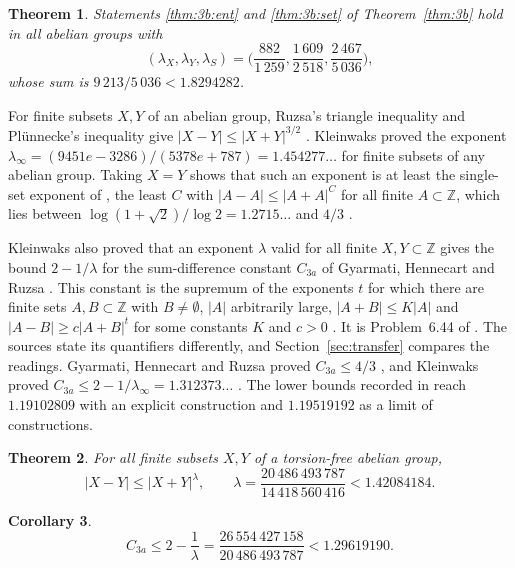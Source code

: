 \documentclass[11pt]{amsart}
\newtheorem{theorem}{Theorem}[section]
\newtheorem{corollary}[theorem]{Corollary}
\theoremstyle{definition}
\theoremstyle{remark}
\numberwithin{equation}{section}
\newcommand{\Z}{\mathbb{Z}}
\newcommand{\CgSlash}{9\,213/5\,036}
\newcommand{\CgUp}{1.8294282}
\newcommand{\CgLamXd}{\frac{882}{1\,259}}
\newcommand{\CgLamYd}{\frac{1\,609}{2\,518}}
\newcommand{\CgLamSd}{\frac{2\,467}{5\,036}}
\newcommand{\LmLamFrac}{\frac{20\,486\,493\,787}{14\,418\,560\,416}}
\newcommand{\LmLamUp}{1.42084184}
\newcommand{\LmCaFrac}{\frac{26\,554\,427\,158}{20\,486\,493\,787}}
\newcommand{\LmCaUp}{1.29619190}
\begin{document}
\begin{theorem}\label{thm:3ball}
Statements \ref{thm:3b:ent} and \ref{thm:3b:set} of Theorem~\ref{thm:3b} hold in all abelian groups with
\[
(\lambda_X,\lambda_Y,\lambda_S)=\bigl(\CgLamXd,\CgLamYd,\CgLamSd\bigr),
\]
whose sum is $\CgSlash<\CgUp$.
\end{theorem}

For finite subsets $X,Y$ of an abelian group, Ruzsa's triangle inequality and Pl\"unnecke's inequality give $|X-Y|\le|X+Y|^{3/2}$ \cite[\S1]{GHR07}. Kleinwaks \cite[Theorem~2.1]{Kle26} proved the exponent $\lambda_\infty=(9451e-3286)/(5378e+787)=1.454277\ldots$ for finite subsets of any abelian group. Taking $X=Y$ shows that such an exponent is at least the single-set exponent of \cite[Problem~6.43]{GGTW25}, the least $C$ with $|A-A|\le|A+A|^{C}$ for all finite $A\subset\Z$, which lies between $\log(1+\sqrt2)/\log2=1.2715\ldots$ \cite{HRY99} and $4/3$ \cite{FP73}.

Kleinwaks also proved that an exponent $\lambda$ valid for all finite $X,Y\subset\Z$ gives the bound $2-1/\lambda$ for the sum-difference constant $C_{3a}$ of Gyarmati, Hennecart and Ruzsa \cite[Theorem~2.2]{Kle26}. This constant is the supremum of the exponents $t$ for which there are finite sets $A,B\subset\Z$ with $B\ne\emptyset$, $|A|$ arbitrarily large, $|A+B|\le K|A|$ and $|A-B|\ge c|A+B|^{t}$ for some constants $K$ and $c>0$ \cite[page 3a]{TaoC}. It is Problem~6.44 of \cite{GGTW25}. The sources state its quantifiers differently, and Section~\ref{sec:transfer} compares the readings. Gyarmati, Hennecart and Ruzsa proved $C_{3a}\le4/3$ \cite[Corollary~3]{GHR07}, and Kleinwaks proved $C_{3a}\le2-1/\lambda_\infty=1.312373\ldots$ \cite[Corollary~2.3]{Kle26}. The lower bounds recorded in \cite[page 3a]{TaoC} reach $1.19102809$ with an explicit construction and $1.19519192$ as a limit of constructions.

\begin{theorem}\label{thm:pair}
For all finite subsets $X,Y$ of a torsion-free abelian group,
\[
|X-Y|\le|X+Y|^{\lambda},\qquad \lambda=\LmLamFrac<\LmLamUp.
\]
\end{theorem}

\begin{corollary}\label{cor:3a}
\[
C_{3a}\le2-\frac1\lambda=\LmCaFrac<\LmCaUp.
\]
\end{corollary}
\end{document}

